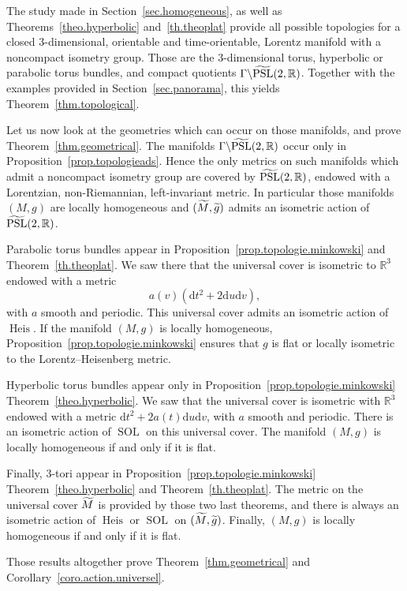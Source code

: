 \documentclass[11pt]{article}
\theoremstyle{definition}
\numberwithin{equation}{section}
\numberwithin{figure}{section}
\numberwithin{table}{section}
\DeclareMathOperator{\PSL}{PSL}
\DeclareMathOperator{\Sol}{SOL}
\DeclareMathOperator{\Heis}{Heis}
\newcommand{\tm}{\tilde{{M}}}
\newcommand*\RR{\mathbb{R}}
\let\oldtilde\tilde
\renewcommand*\tilde[1]{\mathchoice{\widetilde{#1}}{\widetilde{#1}}{\widetilde{#1}}{\oldtilde{#1}}}
\newcommand*{\dd}{\mathrm{d}}
\newcommand*{\dt}{\dd t}
\newcommand*{\du}{\dd u}
\newcommand*{\dv}{\dd v}
\begin{document}
The study made in Section~\ref{sec.homogeneous}, as well as Theorems~\ref{theo.hyperbolic} and~\ref{th.theoplat} provide all possible topologies for a closed $3$-dimensional, orientable and time-orientable, Lorentz manifold with a noncompact isometry group. Those are the $3$-dimensional torus, hyperbolic or parabolic torus bundles, and compact quotients $\Gamma \backslash \tilde{\PSL}(2,\RR)$. Together with the examples provided in Section~\ref{sec.panorama}, this yields Theorem~\ref{thm.topological}.

Let us now look at the geometries which can occur on those manifolds, and prove Theorem~\ref{thm.geometrical}. The manifolds $\Gamma \backslash \tilde{\PSL}(2,\RR)$ occur only in Proposition~\ref{prop.topologieads}. Hence the only metrics on such manifolds which admit a noncompact isometry group are covered by $\tilde{\PSL}(2,\RR)$, endowed with a Lorentzian, non-Riemannian, left-invariant metric. In particular those manifolds $(M,g)$ are locally homogeneous and $(\tm,\tilde{g})$ admits an isometric action of $\tilde{\PSL}(2,\RR)$.

Parabolic torus bundles appear in Proposition~\ref{prop.topologie.minkowski} and Theorem~\ref{th.theoplat}. We saw there that the universal cover is isometric to $\RR^3$ endowed with a metric
\[
a(v)(\dt^2+2\du\dv),
\]
with $a$ smooth and periodic. This universal cover admits an isometric action of $\Heis$. If the manifold $(M,g)$ is locally homogeneous, Proposition~\ref{prop.topologie.minkowski} ensures that $g$ is flat or locally isometric to the Lorentz--Heisenberg metric.

Hyperbolic torus bundles appear only in Proposition~\ref{prop.topologie.minkowski} Theorem~\ref{theo.hyperbolic}. We saw that the universal cover is isometric with $\RR^3$ endowed with a metric $\dt^2+2a(t)\du\dv$, with $a$ smooth and periodic. There is an isometric action of $\Sol$ on this universal cover. The manifold $(M,g)$ is locally homogeneous if and only if it is flat.

Finally, $3$-tori appear in Proposition~\ref{prop.topologie.minkowski} Theorem~\ref{theo.hyperbolic} and Theorem~\ref{th.theoplat}. The metric on the universal cover $\tm$ is provided by those two last theorems, and there is always an isometric action of $\Heis$ or $\Sol$ on $(\tm,\tilde{g})$. Finally, $(M,g)$ is locally homogeneous if and only if it is flat.


Those results altogether prove Theorem~\ref{thm.geometrical} and Corollary~\ref{coro.action.universel}.
\end{document}
